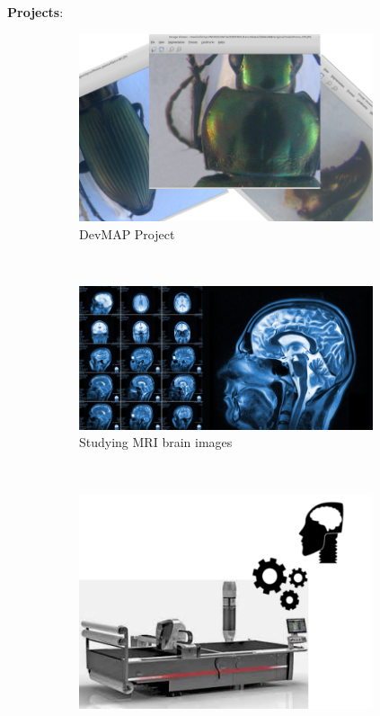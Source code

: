 \documentclass[10pt,svgnames]{beamer}
\begin{document}
{\begin{frame}
\textbf{Projects}:
	\begin{figure}[htbp]
    			\begin{subfigure}[t]{0.23\textwidth}
        			\centering
        			\includegraphics[width=0.95\textwidth]{images/project-maelab}
        			\caption*{\footnotesize{DevMAP Project }}
        			\label{figsub22}
    			\end{subfigure}
    			~ 
    			\begin{subfigure}[t]{0.23\textwidth}
        			\centering
        			\includegraphics[width=0.95\textwidth]{images/MRI_brain}
        			\caption*{\footnotesize{Studying MRI brain images}}
        			\label{figsub22}
    			\end{subfigure}
    			~ 
    			\begin{subfigure}[t]{0.23\textwidth}
        			\centering
        			\includegraphics[width=0.95\textwidth]{images/project-myriamimage}

\end{subfigure}
\end{figure}
\end{frame}}
\end{document}
